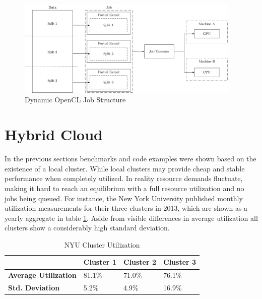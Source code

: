 \begin{figure}[H]
	\includegraphics[width=0.95\textwidth]{drawings/dynamic_opencl_job.pdf}
	\centering
	\caption{Dynamic OpenCL Job Structure}
	\label{img:dynamic_opencl_job}
\end{figure}


\section{Hybrid Cloud}

In the previous sections benchmarks and code examples were shown based on the existence of a local cluster.
While local clusters may provide cheap and stable performance when completely utilized. In reality resource demands fluctuate, making it hard to reach an equilibrium with a full resource utilization and no jobs being queued. For instance, the New York University published monthly utilization measurements for their three clusters in 2013\cite{nyu}, which are shown as a yearly aggregate in table \ref{table:cluster_utilization}. Aside from visible differences in average utilization all clusters show a considerably high standard deviation.

\begin{table}[!htb]
	\centering
	\begin{adjustbox}{width=0.5\textwidth}
		\small
		\begin{tabular}{l | l | l | l}
			~						& \textbf{Cluster 1}	& \textbf{Cluster 2}	& \textbf{Cluster 3}                 \\
			\hline
			\textbf{Average Utilization} 	& 81.1\%  	& 71.0\% 	& 76.1\% \\
			\textbf{Std. Deviation}          & 5.2\%  	& 4.9\%		& 16.9\% \\
		\end{tabular}
	\end{adjustbox}

	\caption{NYU Cluster Utilization}
	\label{table:cluster_utilization}
\end{table}

